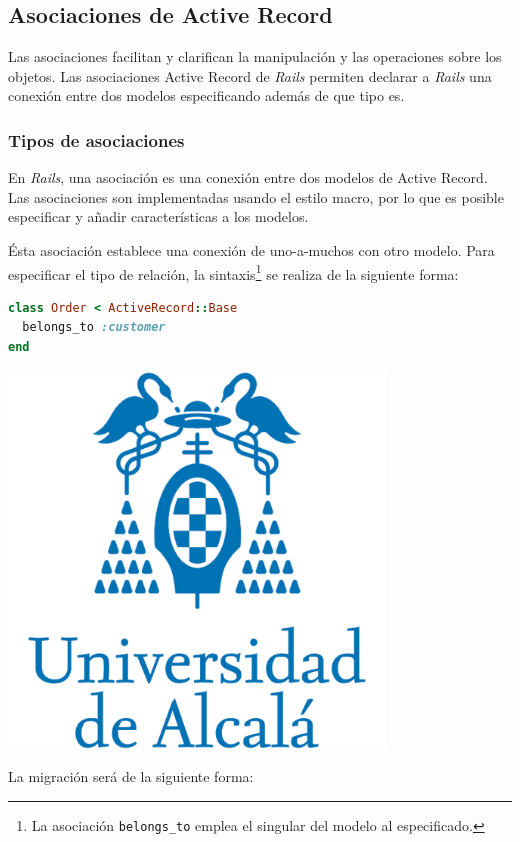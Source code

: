 \subsection{Asociaciones de Active Record}

Las asociaciones facilitan y clarifican la manipulación y las operaciones sobre los objetos. Las asociaciones Active Record de \textit{Rails} permiten declarar a \textit{Rails} una conexión entre dos modelos especificando además de que tipo es.

\subsubsection{Tipos de asociaciones}
En \textit{Rails}, una asociación es una conexión entre dos modelos de Active Record. Las asociaciones son implementadas usando el estilo macro, por lo que es posible especificar y añadir características a los modelos.

Ésta asociación establece una conexión de uno-a-muchos con otro modelo. Para especificar el tipo de relación, la sintaxis\footnote{La asociación \texttt{belongs\_to} emplea el singular del modelo al especificado.} se realiza de la siguiente forma:

\begin{lstlisting}[language=Ruby]
class Order < ActiveRecord::Base
  belongs_to :customer
end
\end{lstlisting}

\includegraphics[width=10cm]{./image/logos/uahlogo3.png}

La migración será de la siguiente forma:

